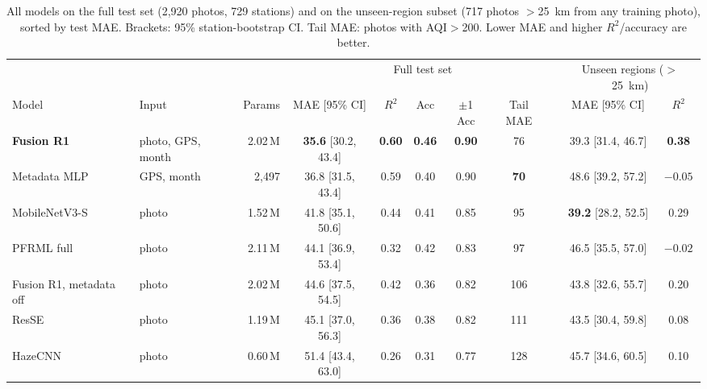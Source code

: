 \documentclass[conference]{IEEEtran}
\begin{document}
\begin{table}[!t]
  \centering
  \caption{
    All models on the full test set (2,920 photos, 729 stations) and on the
    unseen-region subset (717 photos $>$25~km from any training photo), sorted
    by test MAE. Brackets: 95\% station-bootstrap CI. Tail MAE: photos with
    AQI$>$200. Lower MAE and higher $R^2$/accuracy are better.
  }
  \label{tab:main}
  \setlength{\tabcolsep}{4pt}
  \begin{tabular}{llrcccccccc}
    \toprule
                            &                   &         &                              \multicolumn{6}{c}{Full test set}                              & \multicolumn{2}{c}{Unseen regions ($>$25~km)} \\
    \cmidrule(lr){4-9}\cmidrule(lr){10-11}
    Model                   & Input             &  Params &       MAE [95\% CI]        &     $R^2$     &      Acc      &  $\pm$1 Acc   &  Tail MAE   &  &       MAE [95\% CI]        &     $R^2$     \\
    \midrule
    \textbf{Fusion R1}      & photo, GPS, month & 2.02\,M & \textbf{35.6} [30.2, 43.4] & \textbf{0.60} & \textbf{0.46} & \textbf{0.90} &     76      &  &     39.3 [31.4, 46.7]      & \textbf{0.38} \\
    Metadata MLP            & GPS, month        &   2,497 &     36.8 [31.5, 43.4]      &     0.59      &     0.40      &     0.90      & \textbf{70} &  &     48.6 [39.2, 57.2]      &    $-0.05$    \\
    MobileNetV3-S           & photo             & 1.52\,M &     41.8 [35.1, 50.6]      &     0.44      &     0.41      &     0.85      &     95      &  & \textbf{39.2} [28.2, 52.5] &     0.29      \\
    PFRML full              & photo             & 2.11\,M &     44.1 [36.9, 53.4]      &     0.32      &     0.42      &     0.83      &     97      &  &     46.5 [35.5, 57.0]      &    $-0.02$    \\
    Fusion R1, metadata off & photo             & 2.02\,M &     44.6 [37.5, 54.5]      &     0.42      &     0.36      &     0.82      &     106     &  &     43.8 [32.6, 55.7]      &     0.20      \\
    ResSE                   & photo             & 1.19\,M &     45.1 [37.0, 56.3]      &     0.36      &     0.38      &     0.82      &     111     &  &     43.5 [30.4, 59.8]      &     0.08      \\
    HazeCNN                 & photo             & 0.60\,M &     51.4 [43.4, 63.0]      &     0.26      &     0.31      &     0.77      &     128     &  &     45.7 [34.6, 60.5]      &     0.10      \\

\end{tabular}
\end{table}
\end{document}
